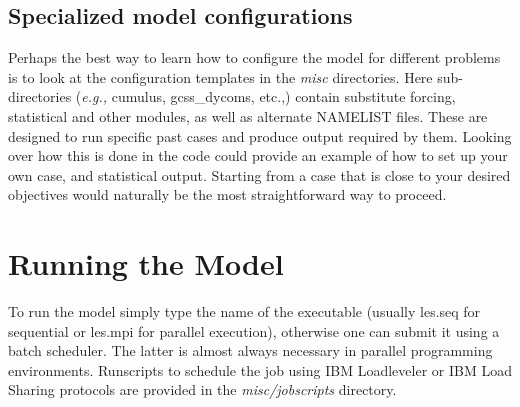 \documentclass[11pt,a4paper]{article}
\begin{document}
\subsection{Specialized model configurations}
Perhaps the best way to learn how to configure the model for different
problems is to look at the configuration templates in the \emph{misc}
directories.  Here sub-directories (\emph{e.g.,} cumulus, gcss\_dycoms,
etc.,) contain substitute forcing, statistical and other modules, as
well as alternate NAMELIST files.  These are designed to run specific
past cases and produce output required by them.  Looking over how this
is done in the code could provide an example of how to set up your own
case, and statistical output.  Starting from a case that is close to
your desired objectives would naturally be the most straightforward
way to proceed.

\section{Running the Model}
To run the model simply type the name of the executable (usually les.seq
for sequential or les.mpi for parallel execution), otherwise one can 
submit it using a batch scheduler. The latter is almost always
necessary in parallel programming environments. Runscripts to
schedule the job using IBM Loadleveler or IBM Load Sharing protocols
are provided in the \emph{misc/jobscripts} directory.
\end{document}

